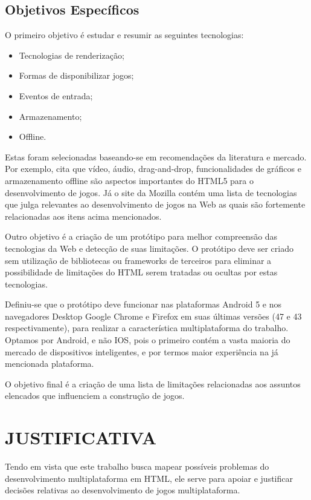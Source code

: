 \subsection{Objetivos Específicos}

O primeiro objetivo é estudar e resumir as seguintes tecnologias:

\begin{itemize}
\item Tecnologias de renderização;
\item Formas de disponibilizar jogos;
\item Eventos de entrada;
\item Armazenamento;
\item Offline.
\end{itemize}

Estas foram selecionadas baseando-se em recomendações da literatura
e mercado. Por exemplo, \citet{browserGamesTechnologyAndFuture} cita
que vídeo, áudio, drag-and-drop, funcionalidades de gráficos e
armazenamento offline são aspectos importantes do HTML5 para o
desenvolvimento de jogos. Já o site da Mozilla \citet{gamesIntroduction}
contém uma lista de tecnologias que julga relevantes ao desenvolvimento
de jogos na Web as quais são fortemente relacionadas aos itens acima
mencionados.

Outro objetivo é a criação de um protótipo para melhor compreensão
das tecnologias da Web e detecção de suas limitações. O protótipo
deve ser criado sem utilização de bibliotecas ou frameworks de
terceiros para eliminar a possibilidade de limitações do HTML serem
tratadas ou ocultas por estas tecnologias.

Definiu-se que o protótipo deve funcionar nas plataformas Android
5 e nos navegadores Desktop Google Chrome e Firefox em suas últimas
versões (47 e 43 respectivamente), para realizar a característica
multiplataforma do trabalho. Optamos por Android, e não IOS, pois
o primeiro contém a vasta maioria do mercado de dispositivos
inteligentes, e por termos maior experiência na já mencionada
plataforma.

O objetivo final é a criação de uma lista de limitações relacionadas
aos assuntos elencados que influenciem a construção de jogos.

\section{JUSTIFICATIVA}

Tendo em vista que este trabalho busca mapear possíveis problemas
do desenvolvimento multiplataforma em HTML, ele serve para apoiar
e justificar decisões relativas ao desenvolvimento de jogos
multiplataforma.

